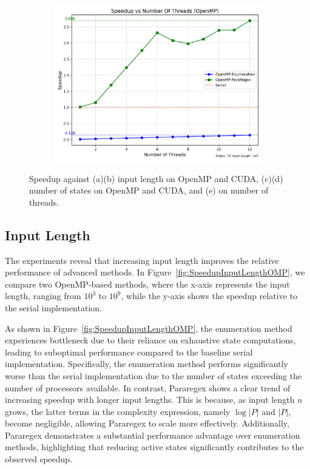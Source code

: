 \documentclass[sigconf]{acmart}
\begin{document}
\begin{figure}[t]
\begin{subfigure}{.33\textwidth}
		\includegraphics[width=\linewidth]{number_of_threads_omp}
		\caption{}
		\label{fig:SpeedupThread}
	\end{subfigure}
	\caption{Speedup against (a)(b) input length on OpenMP and CUDA, (c)(d) number of states on OpenMP and CUDA, and (e) on number of threads.}
	\label{fig:Speedup}
\end{figure}

\subsection{Input Length}
The experiments reveal that increasing input length improves the relative performance of advanced methods. In Figure~\ref{fig:SpeedupInputLengthOMP}, we compare two OpenMP-based methods, where the x-axis represents the input length, ranging from $10^3$ to $10^9$, while the y-axis shows the speedup relative to the serial implementation.

As shown in Figure~\ref{fig:SpeedupInputLengthOMP}, the enumeration method experiences bottleneck due to their reliance on exhaustive state computations, leading to suboptimal performance compared to the baseline serial implementation. Specifically, the enumeration method performs significantly worse than the serial implementation due to the number of states exceeding the number of processors available. In contrast, Pararegex shows a clear trend of increasing speedup with longer input lengths. This is because, as input length $n$ grows, the latter terms in the complexity expression, namely $\log|P|$ and $|P|$, become negligible, allowing Pararegex to scale more effectively. Additionally, Pararegex demonstrates a substantial performance advantage over enumeration methods, highlighting that reducing active states significantly contributes to the observed speedup.
\end{document}
